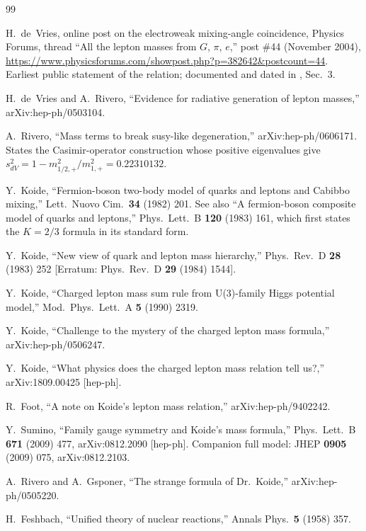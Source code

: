 \documentclass[11pt,a4paper]{article}
\theoremstyle{definition}
\begin{document}
\begin{thebibliography}{99}

 H.~de~Vries,
online post on the electroweak mixing-angle coincidence,
Physics Forums, thread ``All the lepton masses from $G$, $\pi$, $e$,''
post \#44 (November 2004),
\url{https://www.physicsforums.com/showpost.php?p=382642&postcount=44}.
Earliest public statement of the relation; documented and dated in
\cite{rivero2006}, Sec.~3.

 H.~de~Vries and A.~Rivero,
``Evidence for radiative generation of lepton masses,''
arXiv:hep-ph/0503104.

 A.~Rivero,
``Mass terms to break susy-like degeneration,''
arXiv:hep-ph/0606171. States the Casimir-operator construction whose
positive eigenvalues give $s^2_{dV}=1-m^2_{1/2,+}/m^2_{1,+}=0.22310132$.

 Y.~Koide,
``Fermion-boson two-body model of quarks and leptons and Cabibbo mixing,''
Lett.\ Nuovo Cim.\ {\bf 34} (1982) 201. See also
``A fermion-boson composite model of quarks and leptons,''
Phys.\ Lett.\ B {\bf 120} (1983) 161, which first states the $K=2/3$
formula in its standard form.

 Y.~Koide,
``New view of quark and lepton mass hierarchy,''
Phys.\ Rev.\ D {\bf 28} (1983) 252 [Erratum: Phys.\ Rev.\ D {\bf 29}
(1984) 1544].

 Y.~Koide,
``Charged lepton mass sum rule from U(3)-family Higgs potential model,''
Mod.\ Phys.\ Lett.\ A {\bf 5} (1990) 2319.

 Y.~Koide,
``Challenge to the mystery of the charged lepton mass formula,''
arXiv:hep-ph/0506247.

 Y.~Koide,
``What physics does the charged lepton mass relation tell us?,''
arXiv:1809.00425 [hep-ph].

 R.~Foot,
``A note on Koide's lepton mass relation,''
arXiv:hep-ph/9402242.

 Y.~Sumino,
``Family gauge symmetry and Koide's mass formula,''
Phys.\ Lett.\ B {\bf 671} (2009) 477, arXiv:0812.2090 [hep-ph]. Companion
full model: JHEP {\bf 0905} (2009) 075, arXiv:0812.2103.

 A.~Rivero and A.~Gsponer,
``The strange formula of Dr.\ Koide,''
arXiv:hep-ph/0505220.

 H.~Feshbach,
``Unified theory of nuclear reactions,''
Annals Phys.\ {\bf 5} (1958) 357.


\end{thebibliography}
\end{document}
